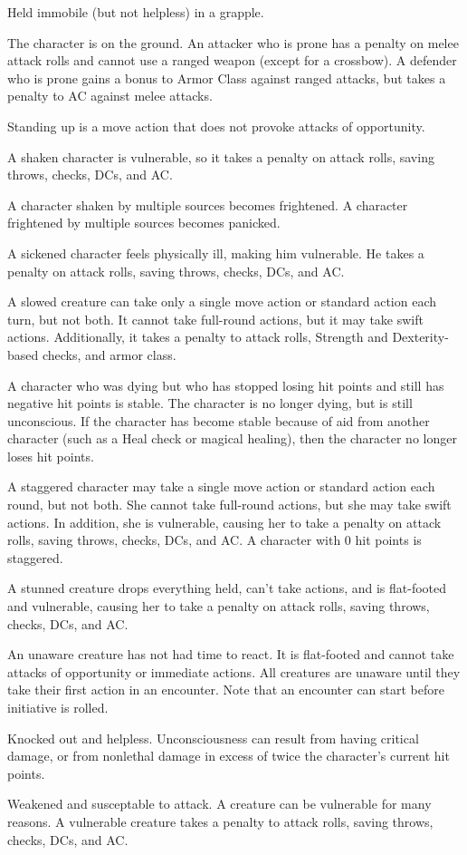  Held immobile (but not helpless) in a grapple.

 The character is on the ground. An attacker who is prone has a  penalty on melee attack rolls and cannot use a ranged weapon (except for a crossbow). A defender who is prone gains a  bonus to Armor Class against ranged attacks, but takes a  penalty to AC against melee attacks.

Standing up is a move action that does not provoke attacks of opportunity.

 A shaken character is vulnerable, so it takes a  penalty on attack rolls, saving throws, checks, DCs, and AC.

A character shaken by multiple sources becomes frightened. A character frightened by multiple sources becomes panicked.

 A sickened character feels physically ill, making him vulnerable. He takes a  penalty on attack rolls, saving throws, checks, DCs, and AC.

 A slowed creature can take only a single move action or standard action each turn, but not both. It cannot take full-round actions, but it may take swift actions. Additionally, it takes a  penalty to attack rolls, Strength and Dexterity-based checks, and armor class.

 A character who was dying but who has stopped losing hit points and still has negative hit points is stable. The character is no longer dying, but is still unconscious. If the character has become stable because of aid from another character (such as a Heal check or magical healing), then the character no longer loses hit points.

 A staggered character may take a single move action or standard action each round, but not both. She cannot take full-round actions, but she may take swift actions. In addition, she is vulnerable, causing her to take a  penalty on attack rolls, saving throws, checks, DCs, and AC. A character with 0 hit points is staggered.

 A stunned creature drops everything held, can't take actions, and is flat-footed and vulnerable, causing her to take a  penalty on attack rolls, saving throws, checks, DCs, and AC.

 An unaware creature has not had time to react. It is flat-footed and cannot take attacks of opportunity or immediate actions. All creatures are unaware until they take their first action in an encounter. Note that an encounter can start before initiative is rolled.

 Knocked out and helpless. Unconsciousness can result from having critical damage, or from nonlethal damage in excess of twice the character's current hit points.

 Weakened and susceptable to attack. A creature can be vulnerable for many reasons. A vulnerable creature takes a  penalty to attack rolls, saving throws, checks, DCs, and AC.
